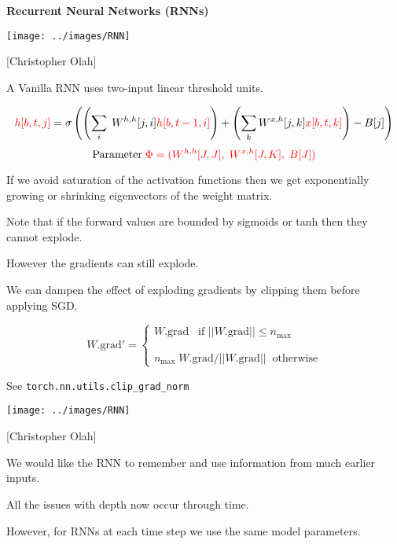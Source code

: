 {\slide{}

\centerline{\bf Recurrent Neural Networks (RNNs)}


\centerline{\texttt{[image: ../images/RNN]}}
\centerline{{\large [Christopher Olah]}}

A Vanilla RNN uses two-input linear threshold units.

{\huge
$${\color{red} h[b,t,j]} = \sigma\left(\left(\sum_i\;W^{h,h}[j,i]{\color{red} h[b,t-1,i]}\right) + \left(\sum_k W^{x,h}[j,k]{\color{red} x[b,t,k]}\right) - B[j]\right)$$
}
\vfill
$$\mathrm{Parameter}\;{\color{red} \Phi = (W^{h,h}[J,J],\;W^{x,h}[J,K],\;B[J])}$$



\vfill
If we avoid saturation of the activation functions then we get exponentially growing or shrinking eigenvectors of the weight matrix.

\vfill
Note that if the forward values are bounded by sigmoids or tanh then they cannot explode.

\vfill
However the gradients can still explode.


\vfill
We can dampen the effect of exploding gradients by clipping them before applying SGD.

\vfill
$$W.\mathrm{grad'} = \left\{\begin{array}{l} W.\mathrm{grad} \;\;\;\mbox{if $||W.\mathrm{grad}|| \leq n_{\mathrm{max}}$} \\
                                                      \\ \\
                                                      n_{\mathrm{max}} \; W.\mathrm{grad} / ||W.\mathrm{grad}|| \;\; \mbox{otherwise}
\end{array} \right.$$

\vfill
See {\tt torch.nn.utils.clip\_grad\_norm}


\centerline{\texttt{[image: ../images/RNN]}}
\centerline{{\large [Christopher Olah]}}

\vfill
We would like the RNN to {\color{red} remember and use} information from much earlier inputs.


\vfill
All the issues with depth now occur through time.

\vfill
However, for RNNs {\color{red} at each time step we use the same model parameters.}

}
